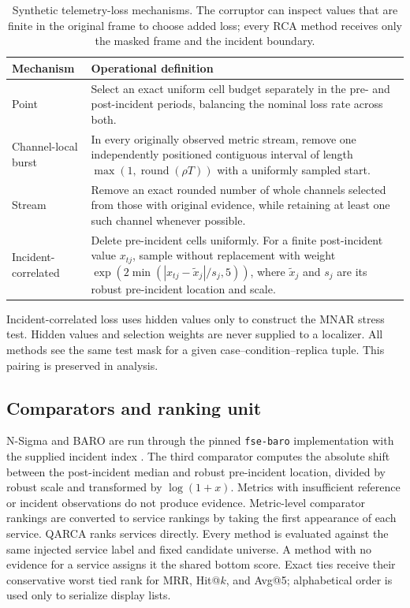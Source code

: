 \documentclass[runningheads]{llncs}
\begin{document}
\begin{table}[t]
\caption{Synthetic telemetry-loss mechanisms. The corruptor can inspect values
that are finite in the original frame to choose added loss; every RCA method receives only the masked
frame and the incident boundary.}
\label{tab:mechanisms}
\centering
\small
\begin{tabular}{p{2.1cm}p{9.0cm}}
\toprule
Mechanism & Operational definition\\
\midrule
Point & Select an exact uniform cell budget separately in the pre- and
post-incident periods, balancing the nominal loss rate across both.\\
Channel-local burst & In every originally observed metric stream, remove one
independently positioned contiguous interval of length
$\max(1,\operatorname{round}(\rho T))$ with a uniformly sampled start.\\
Stream & Remove an exact rounded number of whole channels selected from those
with original evidence, while retaining at least one such channel whenever
possible.\\
Incident-correlated & Delete pre-incident cells uniformly. For a finite
post-incident value $x_{tj}$, sample without replacement with weight
$\exp(2\min(|x_{tj}-\tilde{x}_j|/s_j,5))$, where $\tilde{x}_j$ and $s_j$
are its robust pre-incident location and scale.\\
\bottomrule
\end{tabular}
\end{table}

Incident-correlated loss uses hidden values only to construct the MNAR stress
test. Hidden values and selection weights are never supplied to a localizer.
All methods see the same test mask for a given case--condition--replica tuple.
This pairing is preserved in analysis.

\subsection{Comparators and ranking unit}

N-Sigma and BARO are run through the pinned \texttt{fse-baro} implementation
with the supplied incident index \cite{baro2024}. The third comparator computes
the absolute shift between the post-incident median and robust pre-incident
location, divided by robust scale and transformed by $\log(1+x)$. Metrics with
insufficient reference or incident observations do not produce evidence.
Metric-level comparator rankings are converted to service rankings by taking
the first appearance of each service. QARCA ranks services directly. Every
method is evaluated against the same injected service label and fixed candidate
universe. A method with no evidence for a service assigns it the shared bottom
score. Exact ties receive their conservative worst tied rank for MRR, Hit@$k$,
and Avg@5; alphabetical order is used only to serialize display lists.
\end{document}
